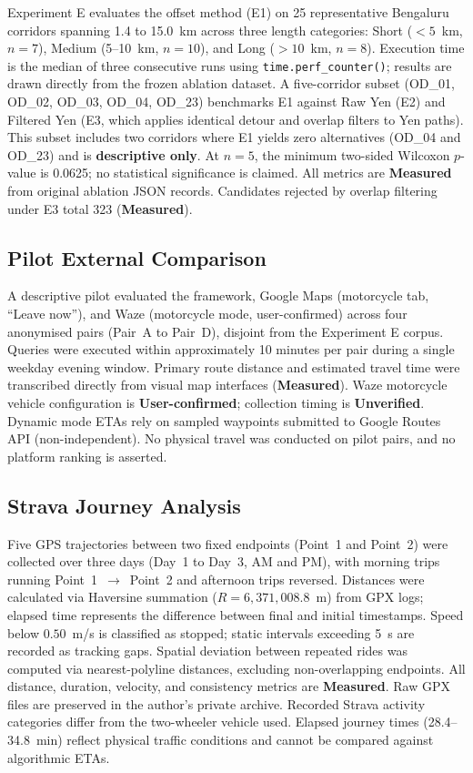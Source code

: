 \documentclass[11pt,conference]{IEEEtran}
\begin{document}
Experiment E evaluates the offset method (E1) on 25 representative Bengaluru corridors spanning 1.4 to 15.0~km across three length categories: Short ($<5$~km, $n=7$), Medium (5--10~km, $n=10$), and Long ($>10$~km, $n=8$).
Execution time is the median of three consecutive runs using \texttt{time.perf\_counter()}; results are drawn directly from the frozen ablation dataset.
A five-corridor subset (OD\_01, OD\_02, OD\_03, OD\_04, OD\_23) benchmarks E1 against Raw Yen (E2) and Filtered Yen (E3, which applies identical detour and overlap filters to Yen paths).
This subset includes two corridors where E1 yields zero alternatives (OD\_04 and OD\_23) and is \textbf{descriptive only}.
At $n=5$, the minimum two-sided Wilcoxon $p$-value is 0.0625; no statistical significance is claimed.
All metrics are \textbf{Measured} from original ablation JSON records.
Candidates rejected by overlap filtering under E3 total 323 (\textbf{Measured}).

\subsection{Pilot External Comparison}
\label{sec:methPilot}

A descriptive pilot evaluated the framework, Google Maps (motorcycle tab, ``Leave now''), and Waze (motorcycle mode, user-confirmed) across four anonymised pairs (Pair~A to Pair~D), disjoint from the Experiment E corpus.
Queries were executed within approximately 10 minutes per pair during a single weekday evening window.
Primary route distance and estimated travel time were transcribed directly from visual map interfaces (\textbf{Measured}).
Waze motorcycle vehicle configuration is \textbf{User-confirmed}; collection timing is \textbf{Unverified}.
Dynamic mode ETAs rely on sampled waypoints submitted to Google Routes API (non-independent).
No physical travel was conducted on pilot pairs, and no platform ranking is asserted.

\subsection{Strava Journey Analysis}
\label{sec:methStrava}

Five GPS trajectories between two fixed endpoints (Point~1 and Point~2) were collected over three days (Day~1 to Day~3, AM and PM), with morning trips running Point~1~$\to$~Point~2 and afternoon trips reversed.
Distances were calculated via Haversine summation ($R = 6{,}371{,}008.8$~m) from GPX logs; elapsed time represents the difference between final and initial timestamps.
Speed below $0.50$~m/s is classified as stopped; static intervals exceeding 5~s are recorded as tracking gaps.
Spatial deviation between repeated rides was computed via nearest-polyline distances, excluding non-overlapping endpoints.
All distance, duration, velocity, and consistency metrics are \textbf{Measured}.
Raw GPX files are preserved in the author's private archive.
Recorded Strava activity categories differ from the two-wheeler vehicle used.
Elapsed journey times (28.4--34.8~min) reflect physical traffic conditions and cannot be compared against algorithmic ETAs.
\end{document}
